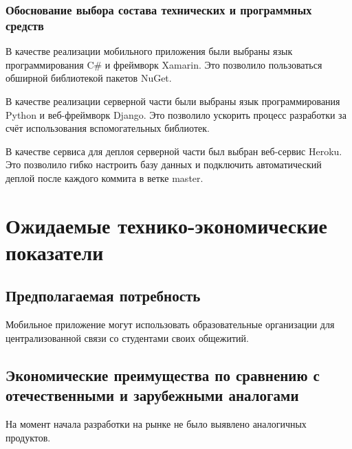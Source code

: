 \documentclass{../includes/TechDoc}
\begin{document}
    \subsubsection{Обоснование выбора состава технических и программных средств}

    В качестве реализации мобильного приложения были выбраны язык программирования C\# и фреймворк Xamarin.
    Это позволило пользоваться обширной библиотекой пакетов NuGet.

    В качестве реализации серверной части были выбраны язык программирования Python и веб-фреймворк Django.
    Это позволило ускорить процесс разработки за счёт использования вспомогательных библиотек.

    В качестве сервиса для деплоя серверной части был выбран веб-сервис Heroku.
    Это позволило гибко настроить базу данных и подключить автоматический деплой после каждого коммита в ветке master.


    \section{Ожидаемые технико-экономические показатели}

    \subsection{Предполагаемая потребность}

    Мобильное приложение могут использовать образовательные организации для централизованной связи со студентами своих
    общежитий.

    \subsection{Экономические преимущества по сравнению с отечественными и зарубежными аналогами}

    На момент начала разработки на рынке не было выявлено аналогичных продуктов.


\end{document}
